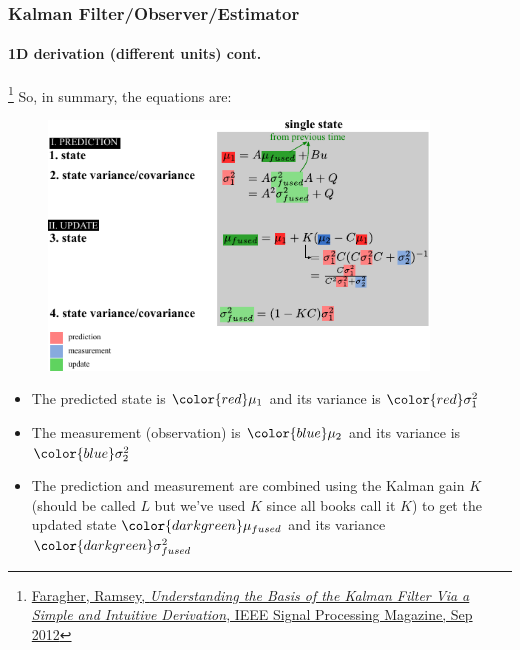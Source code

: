\documentclass{beamer}
\newenvironment{changemargin}[2]
	{
	  	\begin{list}{}
		{
			\setlength{\topsep}{0pt}%
			\setlength{\leftmargin}{#1}%
			\setlength{\rightmargin}{#2}%
			\setlength{\listparindent}{\parindent}%
			\setlength{\itemindent}{\parindent}%
			\setlength{\parsep}{\parskip}%
		}
	  	\item[]
		}
		{\end{list}
	}
\begin{document}
\begin{frame}[plain]
\frametitle{Kalman Filter/Observer/Estimator}
\framesubtitle{1D derivation (different units) \tiny cont.}

\footnote{\tiny\hspace{-0.23in} \href{http://www.cl.cam.ac.uk/~rmf25/papers/Understanding the Basis of the Kalman Filter.pdf}{Faragher, Ramsey, \emph{Understanding the Basis of the Kalman Filter Via a Simple and Intuitive Derivation}, IEEE Signal Processing Magazine, Sep 2012}}
\scriptsize
So, in summary, the equations are:
\begin{changemargin}{-1.4in}{0in}
\begin{figure}[h]
\centering
\includegraphics[width=0.9\textwidth]{figs/TRK_KalmanFilter_equations-1D.pdf}
\end{figure}
\begin{itemize}\scriptsize
\item The predicted state is ${\color{red}\mu_1}$ and its variance is ${\color{red}\sigma^2_1}$
\item The measurement (observation) is ${\color{blue}\mu_2}$ and its variance is ${\color{blue}\sigma^2_2}$
\item The prediction and measurement are combined using the Kalman gain $K$ (should be called $L$ but we've used $K$ since all books call it $K$) to get the updated state ${\color{darkgreen}\mu_{fused}}$ and its variance ${\color{darkgreen}\sigma^2_{fused}}$
\end{itemize}
\end{changemargin}
\end{frame}
\end{document}
